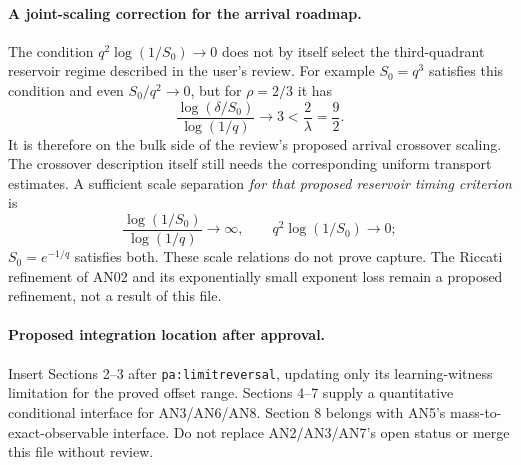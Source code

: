 \documentclass[11pt]{article}
\numberwithin{equation}{section}
\theoremstyle{remark}\newtheorem{remark}[theorem]{Remark}
\newcommand{\1}{\mathbf 1}
\begin{document}
\paragraph{A joint-scaling correction for the arrival roadmap.}
The condition $q^2\log(1/S_0)\to0$ does not by itself select the
third-quadrant reservoir regime described in the user's review.
For example $S_0=q^3$ satisfies this condition and even $S_0/q^2\to0$,
but for $\rho=2/3$ it has
\[
 \frac{\log(\delta/S_0)}{\log(1/q)}\longrightarrow3<\frac2\lambda=\frac92.
\]
It is therefore on the bulk side of the review's proposed arrival
crossover scaling. The crossover description itself still needs the
corresponding uniform transport estimates. A sufficient scale separation
\emph{for that proposed reservoir timing criterion} is
\[
 \frac{\log(1/S_0)}{\log(1/q)}\to\infty,\qquad
 q^2\log(1/S_0)\to0;
\]
$S_0=e^{-1/q}$ satisfies both. These scale relations do not prove capture.
The Riccati refinement of AN02 and its exponentially small exponent loss
remain a proposed refinement, not a result of this file.

\paragraph{Proposed integration location after approval.}
Insert Sections 2--3 after \texttt{pa:limitreversal}, updating only its
learning-witness limitation for the proved offset range.
Sections 4--7 supply a quantitative conditional interface for AN3/AN6/AN8.
Section 8 belongs with AN5's mass-to-exact-observable interface.
Do not replace AN2/AN3/AN7's open status or merge this file without review.
\end{document}
